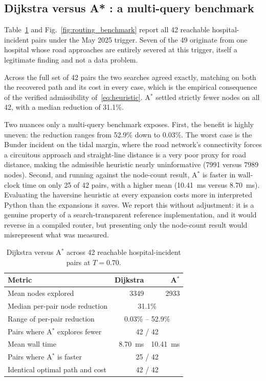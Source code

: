 \documentclass[10pt,twocolumn]{article}
\begin{document}
\subsection{Dijkstra versus A* : a multi-query benchmark}
\label{sec:res-algo}

Table~\ref{tab:algo} and Fig.~\ref{fig:routing_benchmark} report all 42
reachable hospital-incident pairs under the May 2025 trigger. Seven of the 49
originate from one hospital whose road approaches are entirely severed at this
trigger, itself a legitimate finding and not a data problem.

Across the full set of 42 pairs the two searches agreed exactly, matching on both
the recovered path and its cost in every case, which is the empirical consequence
of the verified admissibility of~\eqref{eq:heuristic}. A$^\ast$ settled
strictly fewer nodes on all 42, with a median reduction of 31.1\%.

Two nuances only a multi-query benchmark exposes. First, the benefit is highly
uneven: the reduction ranges from 52.9\% down to 0.03\%. The worst case is the
Bunder incident on the tidal margin, where the road network's connectivity forces
a circuitous approach and straight-line distance is a very poor proxy for road
distance, making the admissible heuristic nearly uninformative (\num{7991} versus
\num{7989} nodes). Second, and running against the node-count result, A$^\ast$ is
faster in wall-clock time on only 25 of 42 pairs, with a higher mean
(\SI{10.41}{\milli\second} versus \SI{8.70}{\milli\second}). Evaluating the
haversine heuristic at every expansion costs more in interpreted Python than the
expansions it saves. We report this without adjustment: it is a genuine property
of a search-transparent reference implementation, and it would reverse in a
compiled router, but presenting only the node-count result would misrepresent
what was measured.

\begin{table}[!t]
\centering\footnotesize
\caption{Dijkstra versus A$^\ast$ across 42 reachable hospital-incident pairs at
$T=0.70$.}
\label{tab:algo}
\small
\begin{tabular}{@{}lrr@{}}
\toprule
\textbf{Metric} & \textbf{Dijkstra} & \textbf{A}$^\ast$ \\
\midrule
Mean nodes explored & \num{3349} & \num{2933} \\
Median per-pair node reduction & \multicolumn{2}{c}{31.1\%} \\
Range of per-pair reduction & \multicolumn{2}{c}{0.03\% -- 52.9\%} \\
Pairs where A$^\ast$ explores fewer & \multicolumn{2}{c}{42 / 42} \\
Mean wall time & \SI{8.70}{\milli\second} & \SI{10.41}{\milli\second} \\
Pairs where A$^\ast$ is faster & \multicolumn{2}{c}{25 / 42} \\
Identical optimal path and cost & \multicolumn{2}{c}{42 / 42} \\
\bottomrule
\end{tabular}
\end{table}
\end{document}

